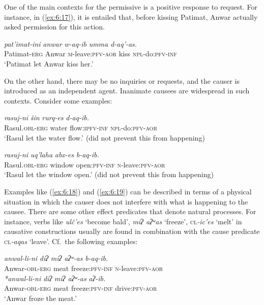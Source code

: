 ﻿\documentclass[output=paper]{langsci/langscibook}
\begin{document}
One of the main contexts for the permissive is a positive response to
request. For instance, in (\ref{ex:6:17}), it is entailed that, before kissing
Patimat, Anwar actually asked permission for this action.

\ea \label{ex:6:17} %
\gll \emph{pat'imat-ini} \emph{anwar} \emph{w-aq-ib} \emph{umma} \emph{d-aq'-as.}\\
Patimat-\textsc{erg} Anwar \textsc{m}-leave:\textsc{pfv}-\textsc{aor} kiss \textsc{npl}-do:\textsc{pfv}-\textsc{inf}\\
\glt `Patimat let Anwar kiss her.'
\z

On the other hand, there may be no inquiries or requests, and the causer
is introduced as an independent agent. Inanimate causees are widespread in such contexts.
Consider some examples:


\ea \label{ex:6:18} %
\gll \emph{rasuj-ni} \emph{šin} \emph{rurq-es} \emph{d-aq-ib.}\\
Rasul.\textsc{obl}-\textsc{erg} water flow:\textsc{ipfv}-\textsc{inf} \textsc{npl}-do:\textsc{pfv}-\textsc{aor}\\
\glt ‘Rasul let the water flow.’ (did not prevent this from happening)

\ex \label{ex:6:19} %
\gll \emph{rasuj-ni} \emph{uq'laha} \emph{abx-es} \emph{b-aq-ib.}\\
Rasul.\textsc{obl}-\textsc{erg} window open:\textsc{pfv}-\textsc{inf} \textsc{n}-leave:\textsc{pfv}-\textsc{aor}\tabularnewline\\
\glt 
`Rasul let the window open.' (did not prevent this from happening)
\z

Examples like (\ref{ex:6:18}) and (\ref{ex:6:19}) can be described in terms of a physical
situation in which the causer does not interfere with what is happening to 
the causee. There are some other effect predicates that denote natural
processes. For instance, verbs like \emph{ulč'es} `become
bald', \emph{miʔ aʔʷas} `freeze', \textsc{cl}\emph{-ic'es} `melt' in
causative constructions usually are found in combination with the cause
predicate \textsc{cl}\emph{-aqas} `leave'. Cf.\ the following examples:

\ea %
\ea %
\gll \emph{anwal-li-ni} \emph{diʔ} \emph{miʔ aʔʷ-as} \emph{b-aq-ib.}\\
Anwar-\textsc{obl}-\textsc{erg} meat freeze:\textsc{pfv}-\textsc{inf} \textsc{n}-leave:\textsc{pfv}-\textsc{aor}\\

\ex %
\gll \emph{*anwal-li-ni} \emph{diʔ} \emph{miʔ aʔʷ-as} \emph{aʔ-ib.}\\
Anwar-\textsc{obl}-\textsc{erg} meat freeze:\textsc{pfv}-\textsc{inf} drive:\textsc{pfv}-\textsc{aor}\\
\glt  `Anwar froze the meat.'
\z
\z
\end{document}

